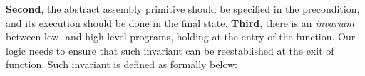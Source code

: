 \textbf{Second}, the abstract assembly primitive should be
specified in the precondition, and its execution
should be done in the final state.
\textbf{Third}, there is an {\it invariant}
between low- and high-level programs, holding at the entry of
the function. Our logic needs to ensure that such invariant
can be reestablished at the exit of function.
% 
Such invariant is defined as \INV{} formally below: 
